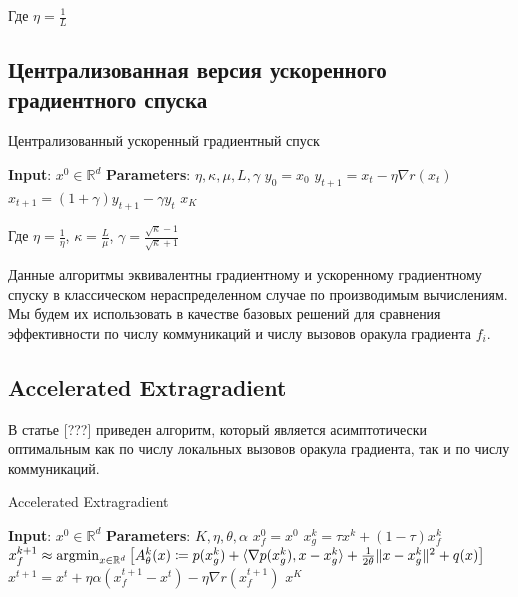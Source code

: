 \documentclass[a4paper,12pt]{extarticle}
\newcommand{\argmin}{\mathop{\rm argmin}}
\newcommand{\eqdef}{\coloneqq}
\def\<#1,#2>{\langle #1,#2\rangle}
\newcommand{\norm}[1]{\|#1\|}
\newcommand{\sqn}[1]{\norm{#1}^2}
\begin{document}
Где $\eta = \frac{1}{L}$

\subsection{Централизованная версия ускоренного градиентного спуска}

\begin{algorithm}[]
    \caption{Централизованный ускоренный градиентный спуск}
    \begin{algorithmic}[1]

    \STATE{} \textbf{Input}: $x^0 \in \mathbb{R}^d$
    \STATE{} \textbf{Parameters}: $\eta, \kappa, \mu, L, \gamma$
    \STATE{} $y_0 = x_0$
    \vspace{0.5ex}
    \vspace{0.5ex}
    \STATE{} $y_{t + 1} = x_{t} - \eta \nabla r(x_t)$
    \STATE{} $x_{t + 1} = (1 + \gamma)y_{t+1} - \gamma y_{t}$
    \vspace{0.5ex}
    \ENDFOR{}
    \RETURN{} $x_{K}$
    \end{algorithmic}
\end{algorithm}

Где $\eta = \frac{1}{\eta}$, $\kappa = \frac{L}{\mu}$, $\gamma = \frac{\sqrt{\kappa} - 1}{\sqrt{\kappa} + 1}$

Данные алгоритмы эквивалентны градиентному и ускоренному градиентному спуску в
классическом нераспределенном случае по производимым вычислениям.
Мы будем их использовать в качестве базовых решений для сравнения эффективности по числу коммуникаций и
числу вызовов оракула градиента $f_i$.


\subsection{Accelerated Extragradient}

В статье [???] приведен алгоритм,
который является асимптотически оптимальным как по числу локальных вызовов оракула градиента,
так и по числу коммуникаций. 


\begin{algorithm}[]
    \caption{Accelerated Extragradient}
    \begin{algorithmic}[1]

    \STATE{} \textbf{Input}: $x^0 \in \mathbb{R}^d$
    \STATE{} \textbf{Parameters}: $K, \eta, \theta, \alpha$
    \STATE{} $x_f^0 = x^0$
    \STATE{} $x_g^k = \tau x^k + (1-\tau)x^k_f$
    \STATE{} $x_f^{k+1} \approx \argmin_{x \in \R^d}\left[ A_\theta^k(x) \eqdef p(x_g^k) + \<\nabla p(x_g^k),x - x_g^k> + \frac{1}{2\theta}\sqn{x - x_g^k} + q(x)\right]$
    \STATE{} $x^{t+1} = x^t + \eta\alpha (x_f^{t+1}  - x^t)- \eta \nabla r(x_f^{t+1})$
    \ENDFOR{}
    \RETURN{} $x^{K}$
    \end{algorithmic}
\end{algorithm}
\end{document}
